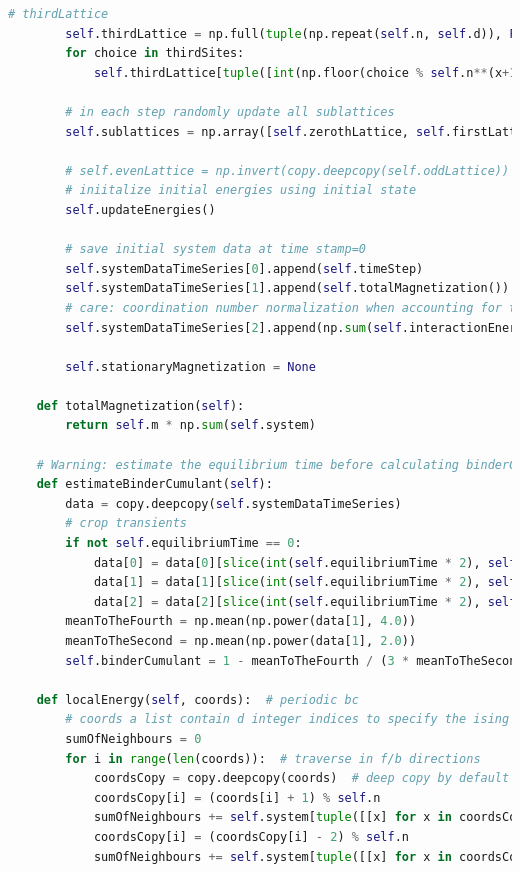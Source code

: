 \documentclass[%
showkeys,
bibnotes,
amsmath,amssymb,
floatfix,
]{revtex4-1}
\begin{document}
\begin{lstlisting}[language=Python]
        # thirdLattice
        self.thirdLattice = np.full(tuple(np.repeat(self.n, self.d)), False)
        for choice in thirdSites:
            self.thirdLattice[tuple([int(np.floor(choice % self.n**(x+1) / self.n**x)) for x in self.dimensions])] = True

        # in each step randomly update all sublattices
        self.sublattices = np.array([self.zerothLattice, self.firstLattice, self.secondLattice, self.thirdLattice])

        # self.evenLattice = np.invert(copy.deepcopy(self.oddLattice))
        # iniitalize initial energies using initial state
        self.updateEnergies()

        # save initial system data at time stamp=0
        self.systemDataTimeSeries[0].append(self.timeStep)
        self.systemDataTimeSeries[1].append(self.totalMagnetization())
        # care: coordination number normalization when accounting for total energy
        self.systemDataTimeSeries[2].append(np.sum(self.interactionEnergies) / 2)

        self.stationaryMagnetization = None

    def totalMagnetization(self):
        return self.m * np.sum(self.system)

    # Warning: estimate the equilibrium time before calculating binderCumulent
    def estimateBinderCumulant(self):
        data = copy.deepcopy(self.systemDataTimeSeries)
        # crop transients
        if not self.equilibriumTime == 0:
            data[0] = data[0][slice(int(self.equilibriumTime * 2), self.timeStep)]
            data[1] = data[1][slice(int(self.equilibriumTime * 2), self.timeStep)]
            data[2] = data[2][slice(int(self.equilibriumTime * 2), self.timeStep)]
        meanToTheFourth = np.mean(np.power(data[1], 4.0))
        meanToTheSecond = np.mean(np.power(data[1], 2.0))
        self.binderCumulant = 1 - meanToTheFourth / (3 * meanToTheSecond ** 2)

    def localEnergy(self, coords):  # periodic bc
        # coords a list contain d integer indices to specify the ising lattice in d dimensional space
        sumOfNeighbours = 0
        for i in range(len(coords)):  # traverse in f/b directions
            coordsCopy = copy.deepcopy(coords)  # deep copy by default
            coordsCopy[i] = (coords[i] + 1) % self.n
            sumOfNeighbours += self.system[tuple([[x] for x in coordsCopy])][0]
            coordsCopy[i] = (coordsCopy[i] - 2) % self.n
            sumOfNeighbours += self.system[tuple([[x] for x in coordsCopy])][0]


\end{lstlisting}
\end{document}
